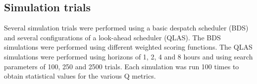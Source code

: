

\subsection{Simulation trials}
Several simulation trials were performed using a basic despatch scheduler (BDS) and several configurations of a look-ahead scheduler (QLAS). The BDS simulations were performed using different weighted scoring functions. The QLAS simulations were performed using horizons of 1, 2, 4 and 8 hours and using search parameters of 100, 250 and 2500 trials. Each simulation was run 100 times to obtain statistical values for the various Q metrics.

